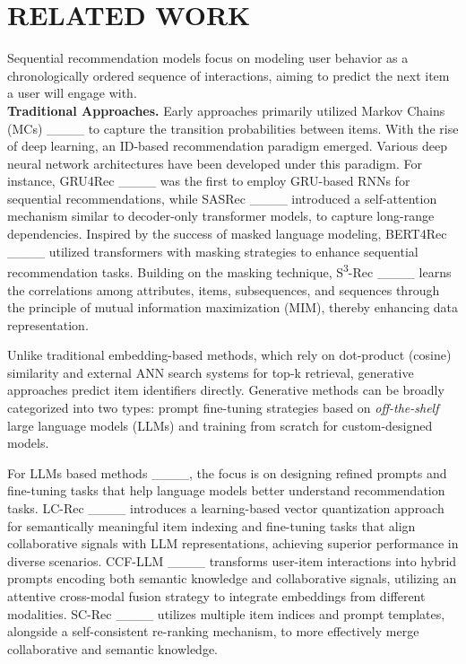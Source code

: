 \section{RELATED WORK}
 Sequential recommendation models focus on modeling user behavior as a chronologically ordered sequence of interactions, aiming to predict the next item a user will engage with.\\
{\bfseries Traditional Approaches.} Early approaches primarily utilized Markov Chains (MCs)  ____ to capture the transition probabilities between items. With the rise of deep learning, an ID-based recommendation paradigm emerged. Various deep neural network architectures have been developed under this paradigm. For instance, GRU4Rec ____ was the first to employ GRU-based RNNs for sequential recommendations, while SASRec ____ introduced a self-attention mechanism similar to decoder-only transformer models, to capture long-range dependencies. Inspired by the success of masked language modeling, BERT4Rec ____ utilized transformers with masking strategies to enhance sequential recommendation tasks. Building on the masking technique, S\textsuperscript{3}-Rec ____ learns the correlations among attributes, items, subsequences, and sequences through the principle of mutual information maximization (MIM), thereby enhancing data representation.

 Unlike traditional embedding-based methods, which rely on dot-product (cosine) similarity and external ANN search systems for top-k retrieval, generative approaches predict item identifiers directly. 
%
Generative methods can be broadly categorized into two types: prompt fine-tuning strategies based on \textit{off-the-shelf} large language models (LLMs) and training from scratch for custom-designed models.

For LLMs based methods ____, the focus is on designing refined prompts and fine-tuning tasks that help language models better understand recommendation tasks. LC-Rec ____ introduces a learning-based vector quantization approach for semantically meaningful item indexing and fine-tuning tasks that align collaborative signals with LLM representations, achieving superior performance in diverse scenarios. CCF-LLM ____ transforms user-item interactions into hybrid prompts encoding both semantic knowledge and collaborative signals, utilizing an attentive cross-modal fusion strategy to integrate embeddings from different modalities. SC-Rec ____ utilizes multiple item indices and prompt templates, alongside a self-consistent re-ranking mechanism, to more effectively merge collaborative and semantic knowledge.

